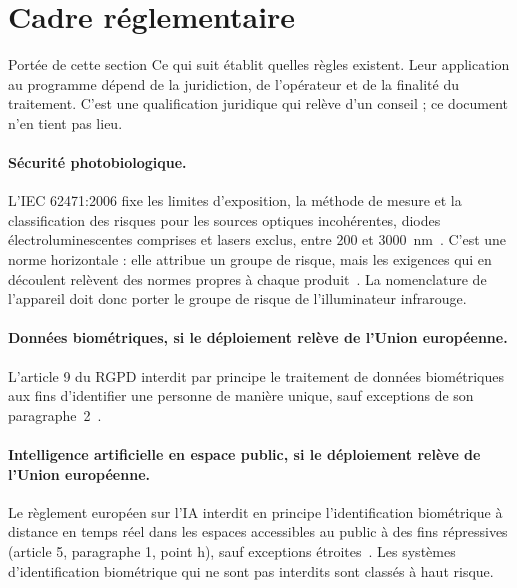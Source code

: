 \documentclass[11pt,a4paper]{article}
\begin{document}
\section{Cadre réglementaire}\label{sec:reglementaire}

\begin{alerte}{Portée de cette section}
Ce qui suit établit quelles règles existent. Leur application au programme dépend de
la juridiction, de l'opérateur et de la finalité du traitement. C'est une
qualification juridique qui relève d'un conseil ; ce document n'en tient pas lieu.
\end{alerte}

\paragraph{Sécurité photobiologique.} L'{\NoAutoSpacing IEC 62471:2006} fixe les limites d'exposition,
la méthode de mesure et la classification des risques pour les sources optiques
incohérentes, diodes électroluminescentes comprises et lasers exclus, entre 200 et
\num{3000}~nm~\cite{iec62471}. C'est une norme horizontale : elle attribue un groupe
de risque, mais les exigences qui en découlent relèvent des normes propres à chaque
produit~\cite{bentham}. La nomenclature de l'appareil doit donc porter le groupe de
risque de l'illuminateur infrarouge.

\paragraph{Données biométriques, si le déploiement relève de l'Union européenne.}
L'article 9 du RGPD interdit par principe le traitement de données biométriques aux
fins d'identifier une personne de manière unique, sauf exceptions de son
paragraphe~2~\cite{gdpr}.

\paragraph{Intelligence artificielle en espace public, si le déploiement relève de
l'Union européenne.} Le règlement européen sur l'IA interdit en principe
l'identification biométrique à distance en temps réel dans les espaces accessibles au
public à des fins répressives (article 5, paragraphe 1, point h), sauf exceptions
étroites~\cite{aiact}. Les systèmes d'identification biométrique qui ne sont pas
interdits sont classés à haut risque.
\end{document}
